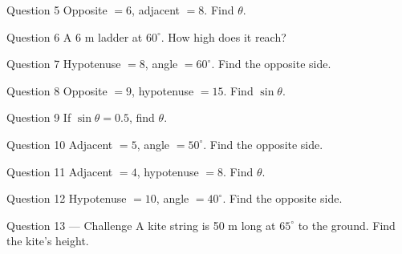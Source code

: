 \documentclass[11pt]{article}
\begin{document}
\begin{qbox}{Question 5}
Opposite $=6$, adjacent $=8$. Find $\theta$.\workspace{2.4cm}
\end{qbox}

\begin{qbox}{Question 6}
A 6 m ladder at $60^\circ$. How high does it reach?\workspace{2.4cm}
\end{qbox}

\begin{qbox}{Question 7}
Hypotenuse $=8$, angle $=60^\circ$. Find the opposite side.\workspace{2.4cm}
\end{qbox}

\begin{qbox}{Question 8}
Opposite $=9$, hypotenuse $=15$. Find $\sin\theta$.\workspace{2.4cm}
\end{qbox}

\begin{qbox}{Question 9}
If $\sin\theta=0.5$, find $\theta$.\workspace{2.4cm}
\end{qbox}

\begin{qbox}{Question 10}
Adjacent $=5$, angle $=50^\circ$. Find the opposite side.\workspace{2.4cm}
\end{qbox}

\begin{qbox}{Question 11}
Adjacent $=4$, hypotenuse $=8$. Find $\theta$.\workspace{2.4cm}
\end{qbox}

\begin{qbox}{Question 12}
Hypotenuse $=10$, angle $=40^\circ$. Find the opposite side.\workspace{2.4cm}
\end{qbox}

\begin{qbox}{Question 13 --- Challenge}
A kite string is 50 m long at $65^\circ$ to the ground. Find the kite's height.\workspace{3cm}
\end{qbox}

\clearpage
{}
\end{document}
